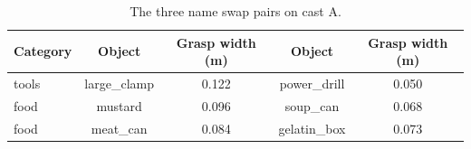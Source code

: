 \begin{table}[H]
\centering
\caption{The three name swap pairs on cast A.}
\label{tab:appendix:swappairs}
\begin{tabular}{lcccc}
\toprule
Category & Object & Grasp width (m) & Object & Grasp width (m) \\
\midrule
tools & large\_clamp & 0.122 & power\_drill & 0.050 \\
food & mustard & 0.096 & soup\_can & 0.068 \\
food & meat\_can & 0.084 & gelatin\_box & 0.073 \\
\bottomrule
\end{tabular}
\end{table}
